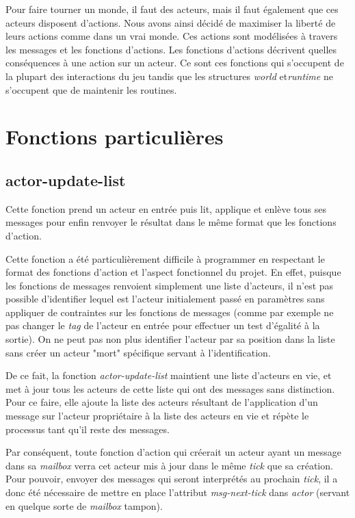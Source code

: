 \documentclass{article}
\begin{document}
Pour faire tourner un monde, il faut des acteurs, mais il faut également que ces acteurs disposent d'actions. Nous avons ainsi décidé de maximiser la liberté de leurs actions comme dans un vrai monde. Ces actions sont modélisées à travers les messages et les fonctions d'actions. Les fonctions d'actions décrivent quelles conséquences à une action sur un acteur. Ce sont ces fonctions qui s'occupent de la plupart des interactions du jeu tandis que les structures \textit{world} et\textit{runtime} ne s'occupent que de maintenir les routines.
   
\section{Fonctions particulières}

\subsection{actor-update-list}

Cette fonction prend un acteur en entrée puis lit, applique et enlève tous ses messages pour enfin renvoyer le résultat dans le même format que les fonctions d'action.

Cette fonction a été particulièrement difficile à programmer en respectant le format des fonctions d'action et l'aspect fonctionnel du projet.
En effet, puisque les fonctions de messages renvoient simplement une liste d'acteurs, il n'est pas possible d'identifier lequel est l'acteur initialement passé en paramètres sans appliquer de contraintes sur les fonctions de messages (comme par exemple ne pas changer le \textit{tag} de l'acteur en entrée pour effectuer un test d'égalité à la sortie).
On ne peut pas non plus identifier l'acteur par sa position dans la liste sans créer un acteur "mort" spécifique servant à l'identification. 

De ce fait, la fonction \textit{actor-update-list} maintient une liste d'acteurs en vie, et met à jour tous les acteurs de cette liste qui ont des messages sans distinction. Pour ce faire, elle ajoute la liste des acteurs résultant de l'application d'un message sur l'acteur propriétaire à la liste des acteurs en vie et répète le processus tant qu'il reste des messages.

Par conséquent, toute fonction d'action qui créerait un acteur ayant un message dans sa \textit{mailbox} verra cet acteur mis à jour dans le même \textit{tick} que sa création. Pour pouvoir, envoyer des messages qui seront interprétés au prochain \textit{tick}, il a donc été nécessaire de mettre en place l'attribut \textit{msg-next-tick} dans \textit{actor} (servant en quelque sorte de \textit{mailbox} tampon).
\end{document}
